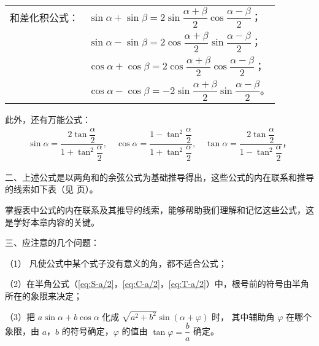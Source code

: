 \begin{tabular}[t]{@{}p{10em}@{}l}
    和差化积公式：& $\sin\alpha + \sin\beta = 2\sin\dfrac{\alpha + \beta}{2} \cos\dfrac{\alpha - \beta}{2}$；\\
    & $\sin\alpha - \sin\beta = 2\cos\dfrac{\alpha + \beta}{2} \sin\dfrac{\alpha - \beta}{2}$；\\
    & $\cos\alpha + \cos\beta = 2\cos\dfrac{\alpha + \beta}{2} \cos\dfrac{\alpha - \beta}{2}$；\\
    & $\cos\alpha - \cos\beta =-2\sin\dfrac{\alpha + \beta}{2} \sin\dfrac{\alpha - \beta}{2}$。
\end{tabular}
\renewcommand\arraystretch{1}

此外，还有万能公式：
\begin{gather*}
    \sin\alpha = \dfrac{2\tan\dfrac{\alpha}{2}}{1 + \tan^2\dfrac{\alpha}{2}} ,\quad
    \cos\alpha = \dfrac{1 - \tan^2\dfrac{\alpha}{2}}{1 + \tan^2\dfrac{\alpha}{2}} ,\quad
    \tan\alpha = \dfrac{2\tan\dfrac{\alpha}{2}}{1 - \tan^2\dfrac{\alpha}{2}} \text{，}
\end{gather*}

\jiange
二、上述公式是以两角和的余弦公式为基础推导得出，这些公式的内在联系和推导的线索如下表（见 \pageref{fig:tuidao} 页）。

掌握表中公式的内在联系及其推导的线索，能够帮助我们理解和记忆这些公式，这是学好本章内容的关键。

三、应注意的几个问题：

（1） 凡使公式中某个式子没有意义的角，都不适合公式；

（2）在半角公式（\ref{eq:S-a/2}，\ref{eq:C-a/2}，\ref{eq:T-a/2}）中，根号前的符号由半角所在的象限来决定；

\begin{figure}[H]
    \centering
    
\end{figure}

（3）把 $a\sin\alpha + b\cos\alpha$ 化成 $\sqrt{a^2 + b^2} \sin(\alpha + \varphi)$ 时，
其中辅助角 $\varphi$ 在哪个象限，由 $a$，$b$ 的符号确定，$\varphi$ 的值由 $\tan\varphi = \dfrac{b}{a}$ 确定。
